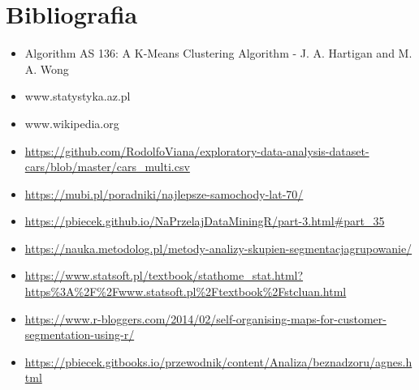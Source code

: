 \documentclass{article}
\begin{document}
\section{Bibliografia}
    \begin{itemize}
        \item Algorithm AS 136: A K-Means Clustering Algorithm - J. A. Hartigan and M. A. Wong
        \item www.statystyka.az.pl
        \item www.wikipedia.org
        \item \url{https://github.com/RodolfoViana/exploratory-data-analysis-dataset-cars/blob/master/cars_multi.csv}
        \item \url{https://mubi.pl/poradniki/najlepsze-samochody-lat-70/}
        \item \url{https://pbiecek.github.io/NaPrzelajDataMiningR/part-3.html#part_35}
        \item \url{https://nauka.metodolog.pl/metody-analizy-skupien-segmentacjagrupowanie/}
        \item \url{https://www.statsoft.pl/textbook/stathome_stat.html?https\%3A%2F%2Fwww.statsoft.pl%2Ftextbook%2Fstcluan.html}
        \item \url{https://www.r-bloggers.com/2014/02/self-organising-maps-for-customer-segmentation-using-r/}
        \item \url{https://pbiecek.gitbooks.io/przewodnik/content/Analiza/beznadzoru/agnes.html}
    \end{itemize}
\end{document}
